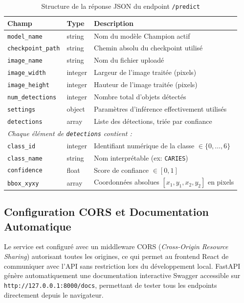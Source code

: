 \documentclass{rapportENSIAS}
\begin{document}
\begin{table}[H]
\centering
\caption{Structure de la réponse JSON du endpoint \texttt{/predict}}
\label{tab:api_response}
\begin{tabular}{p{3.5cm} p{2.5cm} p{8cm}}
\toprule
\textbf{Champ} & \textbf{Type} & \textbf{Description} \\
\midrule
\texttt{model\_name}       & string  & Nom du modèle Champion actif \\
\texttt{checkpoint\_path}  & string  & Chemin absolu du checkpoint utilisé \\
\texttt{image\_name}       & string  & Nom du fichier uploadé \\
\texttt{image\_width}      & integer & Largeur de l'image traitée (pixels) \\
\texttt{image\_height}     & integer & Hauteur de l'image traitée (pixels) \\
\texttt{num\_detections}   & integer & Nombre total d'objets détectés \\
\texttt{settings}          & object  & Paramètres d'inférence effectivement utilisés \\
\texttt{detections}        & array   & Liste des détections, triée par confiance \\
\midrule
\multicolumn{3}{l}{\textit{Chaque élément de \texttt{detections} contient :}} \\
\texttt{class\_id}         & integer & Identifiant numérique de la classe $\in \{0,\ldots,6\}$ \\
\texttt{class\_name}       & string  & Nom interprétable (ex: \texttt{CARIES}) \\
\texttt{confidence}        & float   & Score de confiance $\in [0, 1]$ \\
\texttt{bbox\_xyxy}        & array   & Coordonnées absolues $[x_1, y_1, x_2, y_2]$ en pixels \\
\bottomrule
\end{tabular}
\end{table}

\subsection{Configuration CORS et Documentation Automatique}

Le service est configuré avec un middleware CORS (\textit{Cross-Origin Resource
Sharing}) autorisant toutes les origines, ce qui permet au frontend React de
communiquer avec l'API sans restriction lors du développement local. FastAPI
génère automatiquement une documentation interactive Swagger accessible sur
\texttt{http://127.0.0.1:8000/docs}, permettant de tester tous les endpoints
directement depuis le navigateur.
\end{document}

